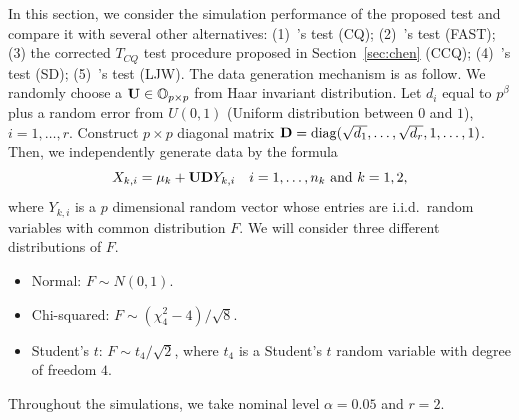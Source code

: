 \documentclass[review]{elsarticle}
\DeclareMathOperator{\mydiag}{diag}
\theoremstyle{plain}
\theoremstyle{definition}
\theoremstyle{remark}
\begin{document}
In this section, we consider the simulation performance of the proposed test and compare it with several other alternatives: (1)~\cite{Chen2010A}'s test (CQ); (2)~\cite{Ma2015A}'s test (FAST); (3) the corrected $T_{CQ}$ test procedure proposed in Section~\ref{sec:chen} (CCQ); (4)~\cite{Srivastava2008A}'s test (SD); (5)~\cite{Lopes2015A}'s test (LJW).
The data generation mechanism is as follow.
We randomly choose a $\mathbf{U}\in\mathbb{O}_{p\times p}$ from Haar invariant distribution.
Let $d_{i}$ equal to $p^{\beta}$ plus a random error from $U(0,1)$ (Uniform distribution between $0$ and $1$), $i=1,\ldots, r$.
Construct $p\times p$ diagonal matrix $\BD=\mydiag(\sqrt{d_1},\ldots,\sqrt{d_r}, 1,\ldots, 1)$.
Then, we independently generate data by the formula
$$
X_{k,i}=\mu_k+\mathbf{U} \mathbf{D} Y_{k,i}\quad \text{$i=1,\ldots,n_k$ and $k=1,2$,}
$$
where $Y_{k,i}$ is a $p$ dimensional random vector whose entries are i.i.d.\ random variables with common distribution $F$.
We will consider three different distributions of $F$.
\begin{itemize}
    \item
        Normal: $F {\sim} N(0,1)$.
    \item
        Chi-squared:  $F\sim (\chi^2_4-4)/\sqrt{8}$.
    \item
        Student's $t$: $F\sim t_4/\sqrt{2}$, where $t_4$ is a Student's $t$ random variable  with degree of freedom $4$.
\end{itemize}
Throughout the simulations, we take nominal level $\alpha=0.05$ and $r=2$.

\end{document}
